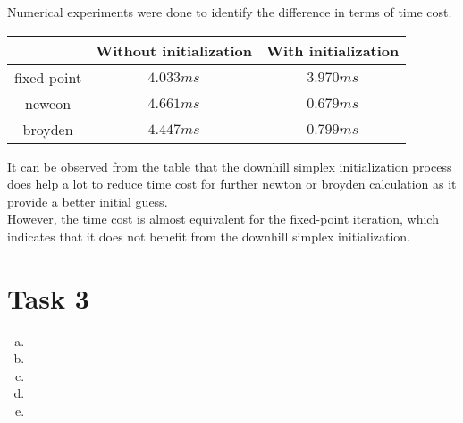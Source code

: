 \documentclass[paper=a4, fontsize=11pt]{scrartcl} %
\numberwithin{equation}{section} %
\numberwithin{figure}{section} %
\numberwithin{table}{section} %
\begin{document}
	Numerical experiments were done to identify the difference in terms of time cost. 
	
	\begin{center}
		\begin{tabular}{ccc}
			\hline
			\quad       & Without initialization & With initialization\\
			\hline
			fixed-point & $4.033 ms$             & $3.970 ms$\\
			neweon      & $4.661 ms$             & $0.679 ms$\\
			broyden     & $4.447 ms$             & $0.799 ms$\\
			\hline
		\end{tabular}
	\end{center}
	
	It can be observed from the table that the downhill simplex initialization process does help a lot to reduce time cost for further newton or broyden calculation as it provide a better initial guess. \\
	However, the time cost is almost equivalent for the fixed-point iteration, which indicates that it does not benefit from the downhill simplex initialization. 

\section{Task 3}
	\begin{enumerate}[(a)]
		\item 
			
		\item 

		\item 

		\item 

		\item 
			
	\end{enumerate}
\end{document}
